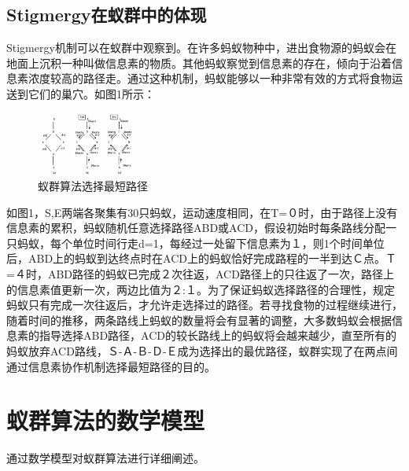 \documentclass[10pt,a4paper,twocolumn,twoside,UTF8]{ctexart}
\begin{document}
 	\subsection{Stigmergy在蚁群中的体现}
	Stigmergy机制可以在蚁群中观察到。在许多蚂蚁物种中，进出食物源的蚂蚁会在地面上沉积一种叫做信息素的物质。其他蚂蚁察觉到信息素的存在，倾向于沿着信息素浓度较高的路径走。通过这种机制，蚂蚁能够以一种非常有效的方式将食物运送到它们的巢穴。如图1所示：
	\begin{figure}[htbp]
		\centering
		\includegraphics[width=0.3\textwidth]{img//pic1.png}
		\caption{蚁群算法选择最短路径}
		\label{pic1}
	\end{figure}
	
	如图1，S,E两端各聚集有30只蚂蚁，运动速度相同，在T=０时，由于路径上没有信息素的累积，蚂蚁随机任意选择路径ABD或ACD，假设初始时每条路线分配一只蚂蚁，每个单位时间行走d=1，每经过一处留下信息素为１，则1个时间单位后，ABD上的蚂蚁到达终点时在ACD上的蚂蚁恰好完成路程的一半到达Ｃ点。Ｔ=４时，ABD路径的蚂蚁已完成２次往返，ACD路径上的只往返了一次，路径上的信息素值更新一次，两边比值为２:１。为了保证蚂蚁选择路径的合理性，规定蚂蚁只有完成一次往返后，才允许走选择过的路径。若寻找食物的过程继续进行，随着时间的推移，两条路线上蚂蚁的数量将会有显著的调整，大多数蚂蚁会根据信息素的指导选择ABD路径，ACD的较长路线上的蚂蚁将会越来越少，直至所有的妈蚁放弃ACD路线，Ｓ-Ａ-Ｂ-Ｄ-Ｅ成为选择出的最优路径，蚁群实现了在两点间通过信息素协作机制选择最短路径的目的。

	\section{蚁群算法的数学模型}
	通过数学模型对蚁群算法进行详细阐述。
\end{document}
